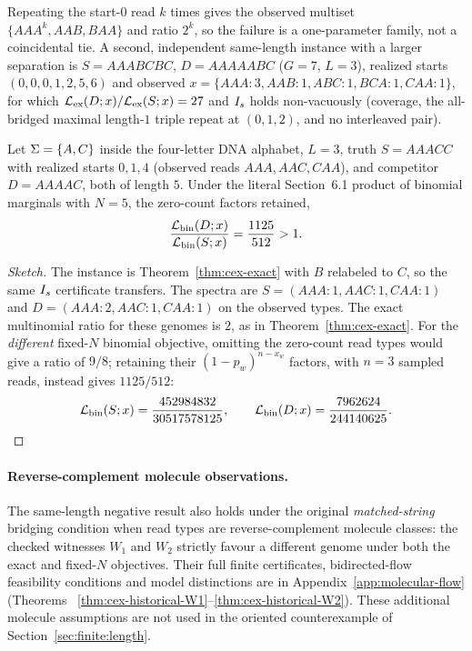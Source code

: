 Repeating the start-$0$ read $k$ times gives the observed multiset
$\{AAA^k,AAB,BAA\}$ and ratio $2^k$, so the failure is a one-parameter family,
not a coincidental tie. A second, independent same-length instance with a
larger separation is $S=AAABCBC$, $D=AAAAABC$ ($G=7$, $L=3$), realized starts
$(0,0,0,1,2,5,6)$ and observed $x=\{AAA:3,AAB:1,ABC:1,BCA:1,CAA:1\}$, for which
$\mathcal{L}_{\mathrm{ex}}(D;x)/\mathcal{L}_{\mathrm{ex}}(S;x)=27$ and $I_s$ holds
non-vacuously (coverage, the all-bridged maximal length-$1$ triple repeat at
$(0,1,2)$, and no interleaved pair).


\begin{theorem}
\label{thm:cex-binomial}
Let $\Sigma=\{A,C\}$ inside the four-letter DNA alphabet, $L=3$, truth
$S=AAACC$ with realized starts $0,1,4$ (observed reads $AAA,AAC,CAA$), and
competitor $D=AAAAC$, both of length $5$. Under the literal Section~6.1 product
of binomial marginals with $N=5$, the zero-count factors retained,
\[
  \frac{\mathcal{L}_{\mathrm{bin}}(D;x)}{\mathcal{L}_{\mathrm{bin}}(S;x)}
  = \frac{1125}{512} > 1 .
\]
\end{theorem}

\begin{proof}[Sketch]
The instance is Theorem~\ref{thm:cex-exact} with $B$ relabeled to $C$, so the
same $I_s$ certificate transfers. The spectra are $S=(AAA:1,AAC:1,CAA:1)$ and
$D=(AAA:2,AAC:1,CAA:1)$ on the observed types. The exact multinomial ratio for these genomes is $2$,
as in Theorem~\ref{thm:cex-exact}. For the \emph{different}
fixed-$N$ binomial objective, omitting the zero-count read
types would give a ratio of $9/8$; retaining their
$(1-p_w)^{n-x_w}$ factors, with $n=3$ sampled reads, instead gives $1125/512$:
\[
  \mathcal{L}_{\mathrm{bin}}(S;x)=\frac{452984832}{30517578125},\qquad
  \mathcal{L}_{\mathrm{bin}}(D;x)=\frac{7962624}{244140625}.
\]
\end{proof}

\paragraph{Reverse-complement molecule observations.}
The same-length negative result also holds under the original
\emph{matched-string} bridging condition when read types are
reverse-complement molecule classes: the checked witnesses
$W_1$ and $W_2$ strictly favour a different genome under
both the exact and fixed-$N$ objectives.
Their full finite certificates, bidirected-flow feasibility
conditions and model distinctions are in
Appendix~\ref{app:molecular-flow} (Theorems~
\ref{thm:cex-historical-W1}--\ref{thm:cex-historical-W2}).
These additional molecule assumptions are not used in the
oriented counterexample of Section~\ref{sec:finite:length}.

